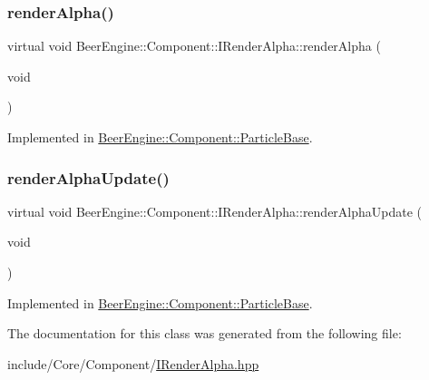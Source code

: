 \subsubsection{\texorpdfstring{render\+Alpha()}{renderAlpha()}}
{\footnotesize\ttfamily virtual void Beer\+Engine\+::\+Component\+::\+I\+Render\+Alpha\+::render\+Alpha (\begin{DoxyParamCaption}\item[{void}]{ }\end{DoxyParamCaption})\hspace{0.3cm}{\ttfamily [pure virtual]}}



Implemented in \mbox{\hyperlink{class_beer_engine_1_1_component_1_1_particle_base_ab891afa6a5b2c99ffe94691bb5419588}{Beer\+Engine\+::\+Component\+::\+Particle\+Base}}.

\mbox{\label{class_beer_engine_1_1_component_1_1_i_render_alpha_ad0fd47a02cc63152b25dbfdb4b2639fa}} 
\subsubsection{\texorpdfstring{render\+Alpha\+Update()}{renderAlphaUpdate()}}
{\footnotesize\ttfamily virtual void Beer\+Engine\+::\+Component\+::\+I\+Render\+Alpha\+::render\+Alpha\+Update (\begin{DoxyParamCaption}\item[{void}]{ }\end{DoxyParamCaption})\hspace{0.3cm}{\ttfamily [pure virtual]}}



Implemented in \mbox{\hyperlink{class_beer_engine_1_1_component_1_1_particle_base_a0cecaefb92ed219eb0ddc2771c513446}{Beer\+Engine\+::\+Component\+::\+Particle\+Base}}.



The documentation for this class was generated from the following file\+:\begin{DoxyCompactItemize}
\item 
include/\+Core/\+Component/\mbox{\hyperlink{_i_render_alpha_8hpp}{I\+Render\+Alpha.\+hpp}}\end{DoxyCompactItemize}
